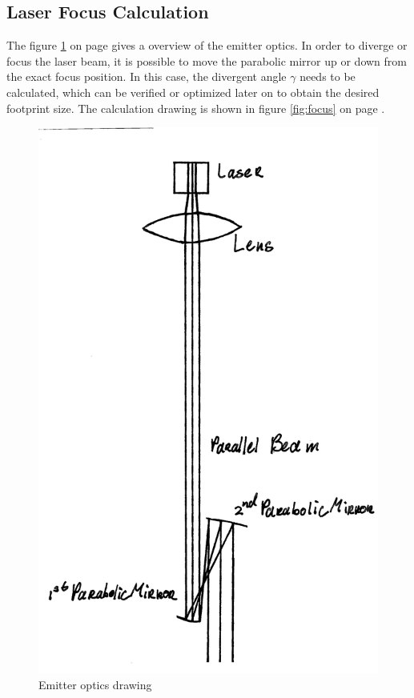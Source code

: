 \subsection{Laser Focus Calculation}
\label{focus}
The figure \ref{fig:EmitterOptics} on page \pageref{fig:EmitterOptics} gives a overview of the emitter optics. In order to diverge or focus the laser beam, it is possible to move the parabolic mirror up or down from the exact focus position. In this case, the divergent angle $\gamma$ needs to be calculated, which can be verified or optimized later on to obtain the desired footprint size. The calculation drawing is shown in figure \ref{fig:focus} on page \pageref{fig:focus}.

\begin{figure}[ht!]
\centering
\includegraphics[scale = 0.7]{chapters/img/EmitterOptics.png}
\caption{Emitter optics drawing}
\label{fig:EmitterOptics}
\end{figure}

